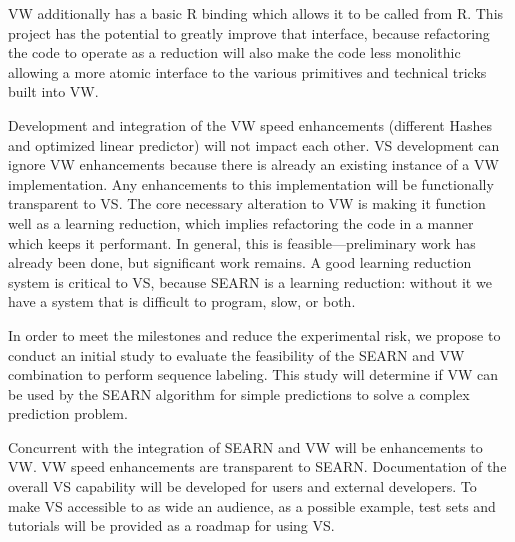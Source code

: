 \ac{VW} additionally has a basic R binding which allows it to be called from R. This project has the potential to greatly improve that interface, because refactoring the code to operate as a reduction will also make the code less monolithic allowing a more atomic interface to the various primitives and technical tricks built into \ac{VW}.

Development and integration of the \ac{VW} speed enhancements (different Hashes and optimized linear predictor) will not impact each other. \ac{VS} development can ignore \ac{VW} enhancements because there is already an existing instance of a \ac{VW} implementation. Any enhancements to this implementation will be functionally transparent to \ac{VS}. The core necessary alteration to \ac{VW} is making it function well as a learning reduction, which implies refactoring the code in a manner which keeps it performant. In general, this is feasible---preliminary work has already been done, but significant work remains. A good learning reduction system is critical to \ac{VS}, because \ac{SEARN} is a learning reduction: without it we have a system that is difficult to program, slow, or both.

In order to meet the milestones and reduce the experimental risk, we propose to conduct an initial study to evaluate the feasibility of the \ac{SEARN} and \ac{VW} combination to perform sequence labeling. This study will determine if \ac{VW} can be used by the \ac{SEARN} algorithm for simple predictions to solve a complex prediction problem.

Concurrent with the integration of \ac{SEARN} and \ac{VW} will be enhancements to \ac{VW}. \ac{VW} speed enhancements are transparent to \ac{SEARN}. Documentation of the overall \ac{VS} capability will be developed for users and external developers. To make \ac{VS} accessible to as wide an audience, as a possible example, test sets and tutorials will be provided as a roadmap for using \ac{VS}.

